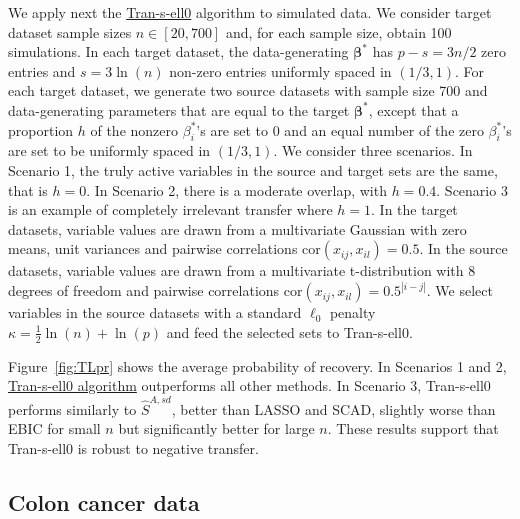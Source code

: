 \documentclass[
  12pt]{article}
\newcommand{\bbeta}{\boldsymbol{\beta}}
\begin{document}
We apply next the \hyperlink{lab:AlgoTL}{Tran-s-ell0} algorithm to simulated data. We consider target dataset sample sizes $n \in [20,700]$ and, for each sample size, obtain 100 simulations.
In each target dataset, the data-generating $\bbeta^*$ has $p-s=3n/2$ zero entries and $s=3\ln(n)$ non-zero entries uniformly spaced in $(1/3,1)$. For each target dataset, we generate two source datasets with sample size 700 and data-generating parameters that are equal to the target $\bbeta^*$, except that a proportion $h$ of the nonzero $\beta_i^*$'s are set to 0 and an equal number of the zero $\beta_i^*$'s are set to be uniformly spaced in $(1/3,1)$. 
We consider three scenarios. In Scenario 1, the truly active variables in the source and target sets are the same, that is $h=0$. In Scenario 2, there is a moderate overlap, with $h=0.4$. Scenario 3 is an example of completely irrelevant transfer where $h=1$. In the target datasets, variable values are drawn from a multivariate Gaussian with zero means, unit variances and pairwise correlations $\mbox{cor}(x_{ij}, x_{il})= 0.5$. In the source datasets, variable values are drawn from a multivariate t-distribution with 8 degrees of freedom and pairwise correlations $\mbox{cor}(x_{ij}, x_{il})= 0.5^{|i-j|}$.
We select variables in the source datasets with a standard $\ell_0$ penalty $\kappa=\tfrac12\ln(n)+\ln(p)$ and feed the selected sets to Tran-s-ell0. 

Figure~\ref{fig:TLpr} shows the average probability of recovery.
In Scenarios 1 and 2, \hyperlink{lab:AlgoTL}{Tran-s-ell0 algorithm} outperforms all other methods. In Scenario 3, Tran-s-ell0 performs similarly to $\hat S^{A,sd}$, better than LASSO and SCAD, slightly worse than EBIC for small $n$ but significantly better for large $n$.
These results support that Tran-s-ell0 is robust to negative transfer.

\subsection{Colon cancer data}
\end{document}
